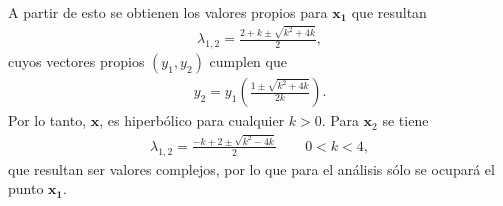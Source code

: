 A partir de esto se obtienen los valores propios para $\mathbf{x_{1}}$ que resultan
\begin{eqnarray}
\lambda_{1,2}=\frac{2+k\pm \sqrt{k^{2}+4k}}{2},
\end{eqnarray}
cuyos vectores propios $(y_{1},y_{2})$ cumplen que
\begin{eqnarray}
y_{2}=y_{1}\left(\frac{1\pm\sqrt{k^{2}+4k}}{2k}\right).
\label{vectores propios}
\end{eqnarray}
Por lo tanto, $\mathbf{x}$, es hiperbólico para cualquier $k>0$. Para $\mathbf{x}_{2}$ se tiene 
\begin{eqnarray}
\lambda_{1,2}=\frac{-k+2 \pm \sqrt{k^{2}-4k}}{2} \qquad 0<k<4,
\end{eqnarray}
que resultan ser valores complejos, por lo que para el análisis sólo se ocupará el punto $\mathbf{x_{1}}$.\\

